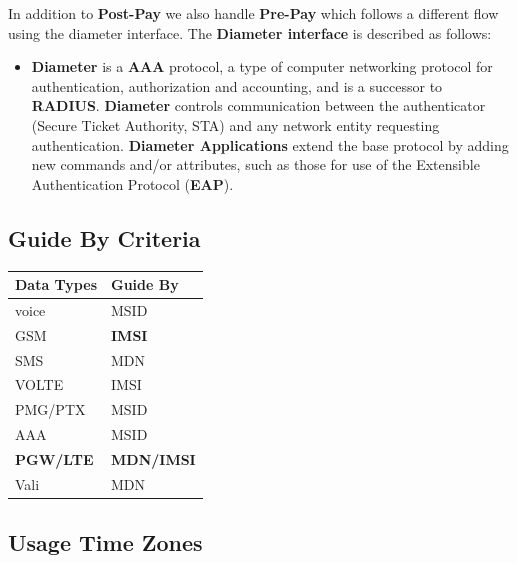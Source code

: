 \documentclass[12pt,twoside]{article}
\begin{document}
   In addition to \textbf{Post-Pay} we also handle \textbf{Pre-Pay} which follows a different flow using the diameter interface. The \textbf{Diameter interface} is described as follows:
\begin{itemize}
\item \textbf{Diameter} is a \textbf{AAA} protocol, a type of computer networking
     protocol for authentication, authorization and accounting, and is
     a successor to \textbf{RADIUS}. \textbf{Diameter} controls communication
     between the authenticator (Secure Ticket Authority, STA) and any
     network entity requesting authentication. \textbf{Diameter Applications}
     extend the base protocol by adding new commands and/or
     attributes, such as those for use of the Extensible
     Authentication Protocol (\textbf{EAP}).
\end{itemize}
\subsection{Guide By Criteria}
\label{sec-2-3}


\begin{center}
\begin{tabular}{ll}
\hline
 \textbf{Data Types}  &  \textbf{Guide By}  \\
\hline
 voice                &  MSID               \\
 GSM                  &  \textbf{IMSI}      \\
 SMS                  &  MDN                \\
 VOLTE                &  IMSI               \\
 PMG/PTX              &  MSID               \\
 AAA                  &  MSID               \\
 \textbf{PGW/LTE}     &  \textbf{MDN/IMSI}  \\
 Vali                 &  MDN                \\
\hline
\end{tabular}
\end{center}
\subsection{Usage Time Zones}
\label{sec-2-4}
\end{document}
